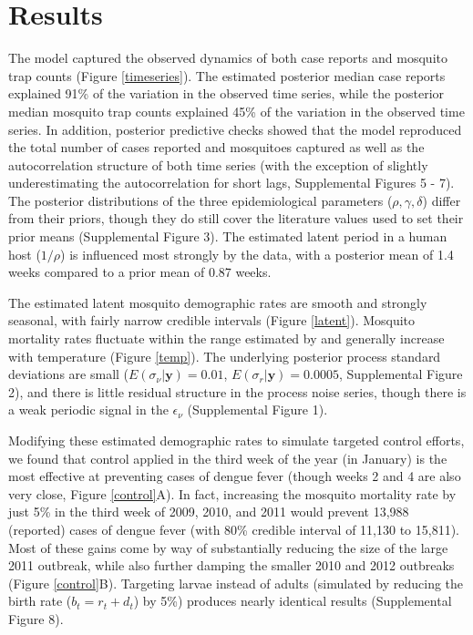 \documentclass[10pt,letterpaper]{article}
\begin{document}
\section*{Results}

The model captured the observed dynamics of both case reports and mosquito trap counts (Figure \ref{timeseries}).
The estimated posterior median case reports explained 91\% of the variation in the observed time series, while the posterior median mosquito trap counts explained 45\% of the variation in the observed time series. 
In addition, posterior predictive checks showed that the model reproduced the total number of cases reported and mosquitoes captured as well as the autocorrelation structure of both time series (with the exception of slightly underestimating the autocorrelation for short lags, Supplemental Figures 5 - 7).
The posterior distributions of the three epidemiological parameters ($\rho, \gamma, \delta$) differ from their priors, though they do still cover the literature values used to set their prior means (Supplemental Figure 3).
The estimated latent period in a human host ($1/\rho$) is influenced most strongly by the data, with a posterior mean of 1.4 weeks compared to a prior mean of 0.87 weeks.

The estimated latent mosquito demographic rates are smooth and strongly seasonal, with fairly narrow credible intervals (Figure \ref{latent}).
Mosquito mortality rates fluctuate within the range estimated by \cite{Brady2013} and generally increase with temperature (Figure \ref{temp}).
The underlying posterior process standard deviations are small ($E(\sigma_{\nu}|\mathbf{y}) = 0.01$, $E(\sigma_r|\mathbf{y}) = 0.0005$, Supplemental Figure 2), and there is little residual structure in the process noise series, though there is a weak periodic signal in the $\epsilon_{\nu}$ (Supplemental Figure 1).

Modifying these estimated demographic rates to simulate targeted control efforts, we found that control applied in the third week of the year (in January) is the most effective at preventing cases of dengue fever (though weeks 2 and 4 are also very close, Figure \ref{control}A).
In fact, increasing the mosquito mortality rate by just 5\% in the third week of 2009, 2010, and 2011 would prevent 13,988 (reported) cases of dengue fever (with 80\% credible interval of 11,130 to 15,811).
Most of these gains come by way of substantially reducing the size of the large 2011 outbreak, while also further damping the smaller 2010 and 2012 outbreaks (Figure \ref{control}B).
Targeting larvae instead of adults (simulated by reducing the birth rate ($b_t = r_t + d_t$) by 5\%) produces nearly identical results (Supplemental Figure 8).
\end{document}
